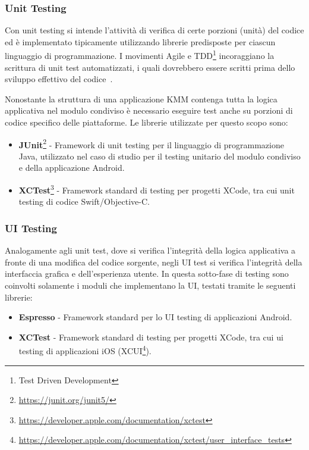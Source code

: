 \subsubsection*{Unit Testing}
Con unit testing si intende l’attività di verifica di certe porzioni (unità) del codice ed è implementato tipicamente utilizzando librerie predisposte per ciascun linguaggio di programmazione. I movimenti Agile e TDD\footnote{Test Driven Development} incoraggiano la scrittura di unit test automatizzati, i quali dovrebbero essere scritti prima dello sviluppo effettivo del codice~\cite{martin2017clean}.

Nonostante la struttura di una applicazione KMM contenga tutta la logica applicativa nel modulo condiviso è necessario eseguire test anche su porzioni di codice specifico delle piattaforme. Le librerie utilizzate per questo scopo sono:

\begin{itemize}
    \item \textbf{JUnit}\footnote{\href{https://junit.org/junit5/}{https://junit.org/junit5/}} - Framework di unit testing per il linguaggio di programmazione Java, utilizzato nel caso di studio per il testing unitario del modulo condiviso e della applicazione Android.
    \item \textbf{XCTest}\footnote{\href{https://developer.apple.com/documentation/xctest}{https://developer.apple.com/documentation/xctest}} - Framework standard di testing per progetti XCode, tra cui unit testing di codice Swift/Objective-C.
\end{itemize}

\subsubsection*{UI Testing}
Analogamente agli unit test, dove si verifica l'integrità della logica applicativa a fronte di una modifica del codice sorgente, negli UI test si verifica l'integrità della interfaccia grafica e dell'esperienza utente. In questa sotto-fase di testing sono coinvolti solamente i moduli che implementano la UI, testati tramite le seguenti librerie:

\begin{itemize}
    \item \textbf{Espresso} - Framework standard per lo UI testing di applicazioni Android.
    \item \textbf{XCTest} - Framework standard di testing per progetti XCode, tra cui ui testing di applicazioni iOS (XCUI\footnote{\href{https://developer.apple.com/documentation/xctest/user\_interface\_tests}{https://developer.apple.com/documentation/xctest/user\_interface\_tests}}).
\end{itemize}



